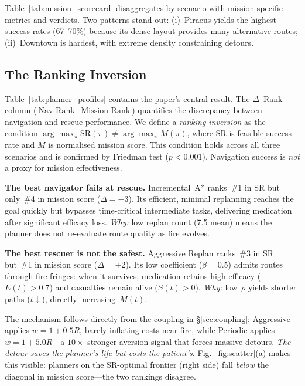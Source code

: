 \documentclass[conference]{IEEEtran}
\begin{document}
Table~\ref{tab:mission_scorecard} disaggregates by scenario with
mission-specific metrics and verdicts. Two patterns stand out:
(i)~Piraeus yields the highest success rates (67--70\%) because its dense
layout provides many alternative routes;
(ii)~Downtown is hardest, with extreme density constraining detours.



\subsection{The Ranking Inversion}\label{sec:ranking}

Table~\ref{tab:planner_profiles} contains the paper's central result.
The $\Delta$~Rank column ($\text{Nav Rank} - \text{Mission Rank}$)
quantifies the discrepancy between navigation and rescue performance.
We define a \emph{ranking inversion} as the condition
$\arg\max_\pi \text{SR}(\pi) \neq \arg\max_\pi M(\pi)$,
where $\text{SR}$ is feasible success rate and $M$ is normalised mission
score. This condition holds across all three scenarios and is confirmed
by Friedman test ($p < 0.001$). Navigation success is \emph{not} a proxy
for mission effectiveness.

\textbf{The best navigator fails at rescue.} Incremental~A* ranks~\#1 in
SR but only~\#4 in mission score ($\Delta{=}{-3}$). Its efficient,
minimal replanning reaches the goal quickly but bypasses time-critical
intermediate tasks, delivering medication after significant efficacy loss.
\emph{Why:} low replan count (7.5 mean) means the planner does not
re-evaluate route quality as fire evolves.

\textbf{The best rescuer is not the safest.} Aggressive Replan ranks~\#3
in SR but~\#1 in mission score ($\Delta{=}{+2}$). Its low coefficient
($\beta{=}0.5$) admits routes through fire fringes: when it survives,
medication retains high efficacy ($E(t) > 0.7$) and casualties remain
alive ($S(t) > 0$). \emph{Why:} low~$\rho$ yields shorter paths
($t \downarrow$), directly increasing~$M(t)$.

The mechanism follows directly from the coupling in
\S\ref{sec:coupling}: Aggressive applies $w = 1 + 0.5R$, barely
inflating costs near fire, while Periodic applies $w = 1 + 5.0R$---a
$10\times$ stronger aversion signal that forces massive detours.
\emph{The detour saves the planner's life but costs the patient's.}
Fig.~\ref{fig:scatter}(a) makes this visible: planners on the
SR-optimal frontier (right side) fall \emph{below} the diagonal in mission
score---the two rankings disagree.
\end{document}
